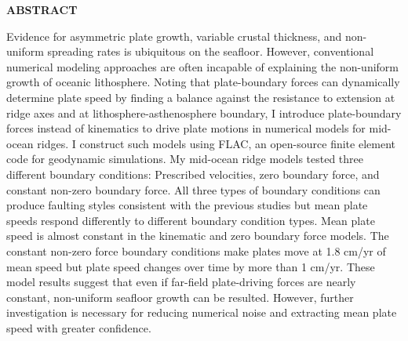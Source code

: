 \documentclass[letterpaper,12pt,notitle]{memphisthesis}                     %
\begin{document}



\doublespacing
{}

\setcounter{page}{2}

%

\newpage
\begin{center}
	\textbf{ABSTRACT}
\end{center}
\vspace{-0.15in}

\thispagestyle{plain}

Evidence for asymmetric plate growth, variable crustal thickness, and non-uniform spreading rates is ubiquitous on the seafloor. However, conventional numerical modeling approaches are often incapable of explaining the non-uniform growth of oceanic lithosphere. Noting that plate-boundary forces can dynamically determine plate speed by finding a balance against the resistance to extension at ridge axes and at lithosphere-asthenosphere boundary, I introduce plate-boundary forces instead of kinematics to drive plate motions in numerical models for mid-ocean ridges. I construct such models using FLAC, an open-source finite element code for geodynamic simulations. My mid-ocean ridge models tested three different boundary conditions: Prescribed velocities, zero boundary force, %
and constant non-zero boundary force. All three types of boundary conditions can produce faulting styles consistent with the previous studies but mean plate speeds respond differently to different boundary condition types. Mean plate speed is almost constant in the kinematic and zero boundary force models. The constant non-zero force boundary conditions make plates move at 1.8 cm/yr of mean speed but plate speed changes over time by more than 1 cm/yr. These model results suggest that even if far-field plate-driving forces are nearly constant, non-uniform seafloor growth can be resulted. However, further investigation is necessary for reducing numerical noise and extracting mean plate speed with greater confidence.

\newpage

\begin{singlespace}
	\tableofcontents
\end{singlespace}
\end{document}

